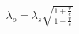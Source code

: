 \documentclass[preview]{standalone}
\begin{document}
\begin{align*}
\lambda_{o}=\lambda_{s}\sqrt{\frac{1+\frac{v}{c}}{1-\frac{v}{c}}}
\end{align*}
\end{document}
